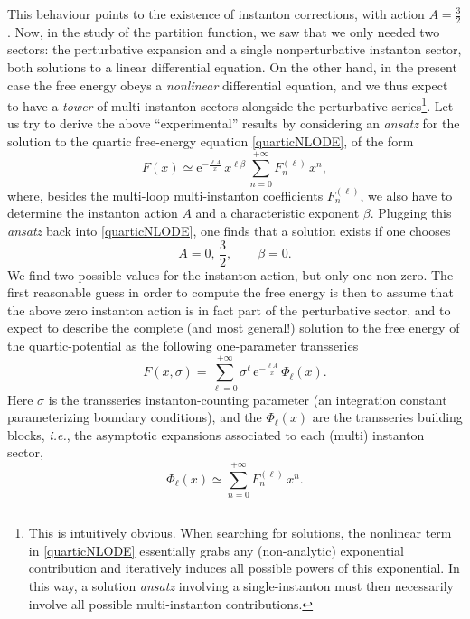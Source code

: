 \documentclass[11pt,a4paper]{article}
\newcommand{\be}{\begin{equation}}
\newcommand{\ee}{\end{equation}}
\newcommand{\rme}{{\mathrm{e}}}
\begin{document}
This behaviour points to the existence of instanton corrections, with action $A=\frac{3}{2}$. Now, in the study of the partition function, we saw that we only needed two sectors: the perturbative expansion and a single nonperturbative instanton sector, both solutions to a linear differential equation. On the other hand, in the present case the free energy obeys a \textit{nonlinear} differential equation, and we thus expect to have a \textit{tower} of multi-instanton sectors alongside the perturbative series\footnote{This is intuitively obvious. When searching for solutions, the nonlinear term in \eqref{quarticNLODE} essentially grabs any (non-analytic) exponential contribution and iteratively induces all possible powers of this exponential. In this way, a solution \textit{ansatz} involving a single-instanton must then necessarily involve all possible multi-instanton contributions.}. Let us try to derive the above ``experimental'' results by considering an \textit{ansatz} for the solution to the quartic free-energy equation \eqref{quarticNLODE}, of the form
%
\be\label{oneparametertransseriesquartic}
F (x) \simeq \rme^{-\frac{\ell A}{x}}\, x^{\ell \beta}\, \sum_{n=0}^{+\infty} F_n^{(\ell)}\, x^n,
\ee
%
\noindent
where, besides the multi-loop multi-instanton coefficients $F_n^{(\ell)}$, we also have to determine the instanton action $A$ and a characteristic exponent $\beta$. Plugging this \textit{ansatz} back into \eqref{quarticNLODE}, one finds that a solution exists if one chooses
%
\be
\label{freeen-initial-transansatz}
A = 0,\, \frac{3}{2}, \qquad \beta = 0.
\ee
%
\noindent
We find two possible values for the instanton action, but only one non-zero. The first reasonable guess in order to compute the free energy is then to assume that the above zero instanton action is in fact part of the perturbative sector, and to expect to describe the complete (and most general!) solution to the free energy of the quartic-potential as the following one-parameter transseries
%
\be
\label{one-param-transseries}
F (x, \sigma) = \sum_{\ell=0}^{+\infty} \sigma^\ell\, \rme^{-\frac{\ell A}{x}}\, \Phi_{\ell} (x).
\ee
%
\noindent
Here $\sigma$ is the transseries instanton-counting parameter (an integration constant parameterizing boundary conditions), and the $\Phi_{\ell} (x)$ are the transseries building blocks, \textit{i.e.}, the asymptotic expansions associated to each (multi) instanton sector,
%
\be
\label{one-param-inst-asympt}
\Phi_{\ell} (x) \simeq \sum_{n=0}^{+\infty} F_n^{(\ell)}\, x^n.
\ee
%
\noindent
\end{document}
